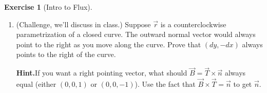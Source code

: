 \documentclass[10pt,]{book}
\theoremstyle{plain}
\theoremstyle{definition}
\theoremstyle{definition}
\theoremstyle{definition}
\theoremstyle{definition}
\newtheorem{exploration}[project]{Exercise}
\theoremstyle{definition}
\numberwithin{equation}{section}
\begin{document}
\begin{exploration}[Intro to Flux]
\begin{enumerate}[font=\bfseries,label=(\alph*),ref=\alph*]
\begin{lstlisting}[style=sageinput]
dr = diff(r,t)                  #Compute the derivative
nds = vector((dr[1],-dr[0]))    #Get the normal vector by swapping the order and changing the sign.

dFlux=F(x=r[0],y=r[1]).dot_product(nds(t)) #Find a little bit of Flux. We dot F and nds 
Flux=integrate(dFlux,bounds)    #Integrate a little bit of flux.

print "The flux of F=",F(x,y), " across the curve r=",r(t), " over the bounds ", bounds," is ", Flux
print ""
print "r = (x,y) = ", r(t)
print "dr = (dx,dy) = ", dr(t)
print "nds = (dy,-dx) = ", nds(t)
print "F = (M,N) = ", F(x,y)
print "F in terms of t = ", F(x=r[0],y=r[1])
print "dFlux = F.nds = Mdy-Ndx = ",dFlux
print "W = integrate F.dr = ", Flux

p=parametric_plot(r(t),bounds)
p+=plot_vector_field(F,xbounds,ybounds)
show(p)
\end{lstlisting}
\item\label{task-494} (Challenge, we'll discuss in class.) Suppose \(\vec r\) is a counterclockwise parametrization of a closed curve.  The outward normal vector would always point to the right as you move along the curve.  Prove that \((dy,-dx)\) always points to the right of the curve.%
\par\medskip\noindent%
\textbf{Hint.}\quad If you want a right pointing vector, what should \(\vec B=\vec T\times \vec n\) always equal (either \((0,0,1)\) or \((0,0,-1)\)). Use the fact that \(\vec B\times \vec T = \vec n\) to get \(\vec n\).%
\end{enumerate}
\end{exploration}
\end{document}

